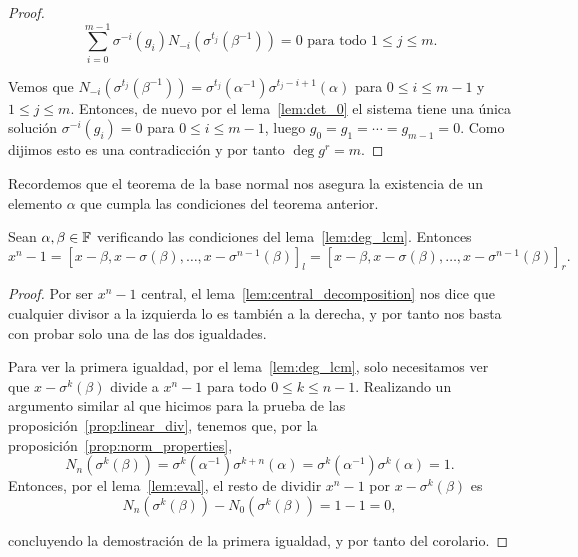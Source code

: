 \begin{proof}
\begin{equation}
\label{linear_system_2}
    \sum_{i=0}^{m-1} \sigma^{-i}(g_i)N_{-i}(\sigma^{t_j}(\beta^{-1})) = 0 \text{ para todo } 1 \leq j \leq m.
\end{equation}

Vemos que \(N_{-i}(\sigma^{t_j}(\beta^{-1})) = \sigma^{t_j}(\alpha^{-1})\sigma^{t_j - i + 1}(\alpha)\) para \(0 \leq i \leq m-1\) y \(1 \leq j \leq m\). Entonces, de nuevo por el lema~\ref{lem:det_0} el sistema tiene una única solución \(\sigma^{-i}(g_i) = 0\) para \(0 \leq i \leq m-1\), luego  \(g_0 = g_1 = \cdots = g_{m-1} = 0\). Como dijimos esto es una contradicción y por tanto \(\deg g^r = m\).
\end{proof}

Recordemos que el teorema de la base normal nos asegura la existencia de un elemento \(\alpha\) que cumpla las condiciones del teorema anterior.

\begin{corollary}
\label{cor:llcm_n}
    Sean \(\alpha, \beta \in \mathbb{F}\) verificando las condiciones del lema~\ref{lem:deg_lcm}. Entonces
\[
x^{n} - 1 = {[x - \beta, x - \sigma(\beta), \ldots, x - \sigma^{n-1}(\beta)]}_l = {[x - \beta, x - \sigma(\beta), \ldots, x - \sigma^{n-1}(\beta)]}_r
.\]
\end{corollary}
\begin{proof}
    Por ser \(x^{n} - 1\) central, el lema~\ref{lem:central_decomposition} nos dice que cualquier divisor a la izquierda lo es también a la derecha, y por tanto nos basta con probar solo una de las dos igualdades.

    Para ver la primera igualdad, por el lema~\ref{lem:deg_lcm}, solo necesitamos ver que \(x - \sigma^{k}(\beta)\) divide a \(x^{n} -1\) para todo \(0 \le k \le n-1\). Realizando un argumento similar al que hicimos para la prueba de las proposición~\ref{prop:linear_div}, tenemos que, por la proposición~\ref{prop:norm_properties},
    \[
N_n(\sigma^{k}(\beta)) = \sigma^{k}(\alpha^{-1})\sigma^{k+n}(\alpha) = \sigma^{k}(\alpha^{-1})\sigma^{k}(\alpha) = 1
    .\]
Entonces, por el lema~\ref{lem:eval}, el resto de dividir \(x^{n} -1\) por \(x - \sigma^{k}(\beta)\) es
\[
N_n(\sigma^{k}(\beta)) - N_0(\sigma^{k}(\beta)) = 1 - 1 = 0
,\]

concluyendo la demostración de la primera igualdad, y por tanto del corolario.
\end{proof}

